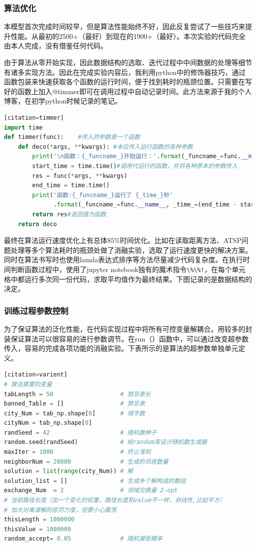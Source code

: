 \documentclass[lang=cn,11pt]{elegantpaper}
\begin{document}
\subsubsection{算法优化}
本模型首次完成时间较早，但是算法性能始终不好，因此反复尝试了一些技巧来提升性能。从最初的2500+（最好）到现在的1900+（最好）。本次实验的代码完全由本人完成，没有借鉴任何代码。

由于算法从零开始实现，因此数据结构的选取、迭代过程中中间数据的处理等细节有诸多实现方法。因此在完成实验内容后，我利用python中的修饰器技巧，通过函数包装来快速获取各个函数的运行时间，便于找到耗时的瓶颈位置。只需要在写好的函数上加入@timmer即可在调用过程中自动记录时间。此方法来源于我的个人博客，在初学python时候记录的笔记。

\begin{lstlisting}[language=python][citation=timmer]
import time
def timmer(func):    #传入的参数是一个函数
    def deco(*args, **kwargs): #本应传入运行函数的各种参数
        print('\n函数：{_funcname_}开始运行：'.format(_funcname_=func.__name__))
        start_time = time.time()#调用代运行的函数，并将各种原本的参数传入
        res = func(*args, **kwargs)
        end_time = time.time()
        print('函数:{_funcname_}运行了 {_time_}秒'
              .format(_funcname_=func.__name__, _time_=(end_time - start_time)))
        return res#返回值为函数
    return deco
\end{lstlisting}

最终在算法运行速度优化上有总体85\%时间优化。比如在读取距离方法、ATSP问题处理等多个算法耗时的瓶颈处做了消融实验，选取了运行速度更快的解决方案。同时在算法书写时也使用lamda表达式排序等方法尽量减少代码复杂度。在执行时间判断函数过程中，使用了jupyter notebook独有的魔术指令\lstinline{\%\%!}，在每个单元格中都运行多次同一份代码，求取平均值作为最终结果。下图记录的是数据结构的决定。

\subsubsection{训练过程参数控制}
为了保证算法的泛化性能，在代码实现过程中将所有可控变量解耦合。用较多的封装保证算法可以很容易的进行参数调节。在run（）函数中，可以通过改变超参数传入，容易的完成各项功能的消融实验。下表所示的是算法的超参数单独单元定义。

\begin{lstlisting}[language=python][citation=varient]
# 算法需要的变量
tabLength = 50                   # 禁忌表长
banned_Table = []                # 禁忌表
city_Num = tab_np.shape[0]       # 城市数
cityNum = tab_np.shape[0]
randSeed = 42                    # 随机数种子
random.seed(randSeed)            # 给random库设计随机数生成器
maxIter = 1000                   # 终止准则
neighborNum = 20000              # 生成的邻居数量
solution = list(range(city_Num)) # 解
solution_list = []               # 生成多个解构成的数组
exchange_Num  = 2                # 领域交换量 2-opt
# 当前路径长度（加一个变化的权重，路径长度和value不一样，非线性,比如平方）
# 加大对离谱解的惩罚力度，但要小心震荡
thisLength = 1000000
thisValue = 1000000
random_accept= 0.05              # 随机接受概率
\end{lstlisting}
\end{document}

